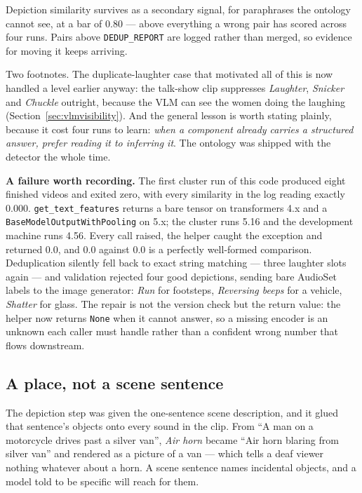 \documentclass[11pt,a4paper]{article}
\begin{document}
Depiction similarity survives as a secondary signal, for paraphrases the ontology cannot see, at a
bar of 0.80 --- above everything a wrong pair has scored across four runs. Pairs above
\texttt{DEDUP\_REPORT} are logged rather than merged, so evidence for moving it keeps arriving.

Two footnotes. The duplicate-laughter case that motivated all of this is now handled a level earlier
anyway: the talk-show clip suppresses \emph{Laughter}, \emph{Snicker} and \emph{Chuckle} outright,
because the VLM can see the women doing the laughing (Section~\ref{sec:vlmvisibility}). And the
general lesson is worth stating plainly, because it cost four runs to learn: \emph{when a component
already carries a structured answer, prefer reading it to inferring it}. The ontology was shipped with
the detector the whole time.

\textbf{A failure worth recording.} The first cluster run of this code produced eight finished videos
and exited zero, with every similarity in the log reading exactly 0.000.
\texttt{get\_text\_features} returns a bare tensor on transformers 4.x and a
\texttt{BaseModelOutputWithPooling} on 5.x; the cluster runs 5.16 and the development machine runs
4.56. Every call raised, the helper caught the exception and returned 0.0, and 0.0 against 0.0 is a
perfectly well-formed comparison. Deduplication silently fell back to exact string matching --- three
laughter slots again --- and validation rejected four good depictions, sending bare AudioSet labels to
the image generator: \emph{Run} for footsteps, \emph{Reversing beeps} for a vehicle, \emph{Shatter}
for glass. The repair is not the version check but the return value: the helper now returns
\texttt{None} when it cannot answer, so a missing encoder is an unknown each caller must handle rather
than a confident wrong number that flows downstream.

\subsection{A place, not a scene sentence}\label{sec:place}
The depiction step was given the one-sentence scene description, and it glued that sentence's objects
onto every sound in the clip. From ``A man on a motorcycle drives past a silver van'', \emph{Air horn}
became ``Air horn blaring from silver van'' and rendered as a picture of a van --- which tells a deaf
viewer nothing whatever about a horn. A scene sentence names incidental objects, and a model told to
be specific will reach for them.
\end{document}
